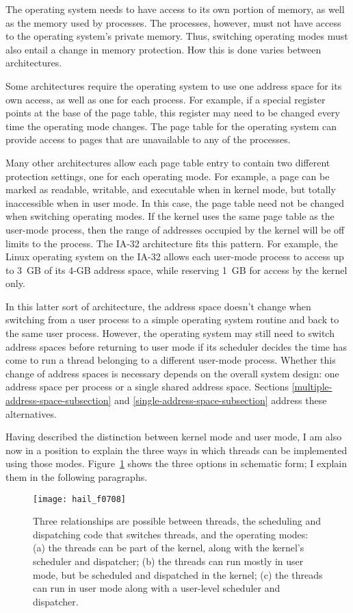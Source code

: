 The operating system needs to have access to its own portion of
memory, as well as the memory used by processes.  The processes,
however, must not have access to the operating system's private
memory.  Thus, switching
operating modes must also entail a change in memory protection.  How
this is done varies between architectures.

Some architectures require the operating system to use one address
space for its own access, as well as one for each process.  For
example, if a special register points at the base of the page table,
this register may need to be changed every time the operating mode
changes.  The page table for the operating system can provide access
to pages that are unavailable to any of the processes.

Many other architectures allow each page table entry to contain two
different protection settings, one for each operating mode.  For
example, a page can be marked as readable, writable, and executable
when in kernel mode, but totally inaccessible when in user mode.  In
this case, the page table need not be changed when switching operating
modes.  If the kernel uses the same page table as the user-mode
process, then the range of addresses occupied by the kernel will be
off limits to the process.  The IA-32 architecture fits this pattern.
For example, the Linux operating system on the IA-32 allows each
user-mode process to access up to 3~GB of its 4-GB address space,
while reserving 1~GB for access by the kernel only.

In this latter sort of architecture, the address space doesn't change
when switching from a user process to a simple operating system
routine and back to the same user process.  However, the operating
system may still need to switch address spaces before returning to
user mode if its scheduler decides the time has come to run a
thread belonging to a 
different user-mode process.  Whether this change of address spaces is
necessary depends on the overall system design: one address space per
process or a single shared address space.
Sections \ref{multiple-address-space-subsection} and \ref{single-address-space-subsection}
address these alternatives.

Having described the distinction between kernel mode and user mode, I
am also now in a position to explain the three ways in which threads
can be implemented using those modes.  Figure~\ref{scan-7-1} shows the
three options in schematic form; I explain them in the following
paragraphs.
\begin{figure}
\centerline{\texttt{[image: hail\_f0708]}}
\caption{Three relationships are possible between threads, the
  scheduling and dispatching code that switches threads, and the operating modes: (a)
  the threads can be part of the kernel, along with the kernel's
  scheduler and dispatcher; (b) the threads can run mostly in user mode, but
  be scheduled and dispatched in the kernel; (c) the threads can run in
  user mode
  along with a user-level scheduler and dispatcher.}
\label{scan-7-1}
\end{figure}

